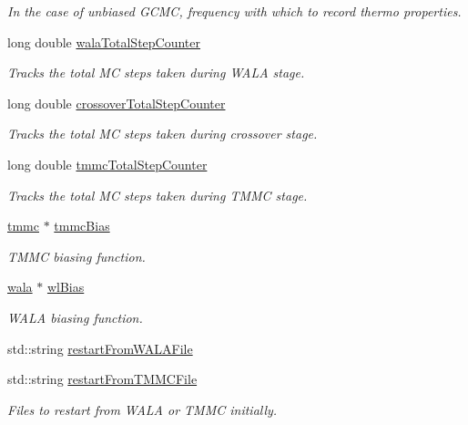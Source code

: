 \begin{DoxyCompactItemize}
\begin{DoxyCompactList}\small\item\em In the case of unbiased G\-C\-M\-C, frequency with which to record thermo properties. \end{DoxyCompactList}\item 
long double \hyperlink{classsim_system_a46f5d3a8843821b45fd3f4d9234a177f}{wala\-Total\-Step\-Counter}
\begin{DoxyCompactList}\small\item\em Tracks the total M\-C steps taken during W\-A\-L\-A stage. \end{DoxyCompactList}\item 
long double \hyperlink{classsim_system_a1d71d1df76bba70136853e30823d2db9}{crossover\-Total\-Step\-Counter}
\begin{DoxyCompactList}\small\item\em Tracks the total M\-C steps taken during crossover stage. \end{DoxyCompactList}\item 
long double \hyperlink{classsim_system_a3ca5ff86766ab388bfd7a48605b10e17}{tmmc\-Total\-Step\-Counter}
\begin{DoxyCompactList}\small\item\em Tracks the total M\-C steps taken during T\-M\-M\-C stage. \end{DoxyCompactList}\item 
\hyperlink{classtmmc}{tmmc} $\ast$ \hyperlink{classsim_system_a13173f45a1e40a5f5a3552b0ebe15b54}{tmmc\-Bias}
\begin{DoxyCompactList}\small\item\em T\-M\-M\-C biasing function. \end{DoxyCompactList}\item 
\hyperlink{classwala}{wala} $\ast$ \hyperlink{classsim_system_a6dc8d9f89dfcfa247a59bc50889c49e7}{wl\-Bias}
\begin{DoxyCompactList}\small\item\em W\-A\-L\-A biasing function. \end{DoxyCompactList}\item 
std\-::string \hyperlink{classsim_system_afbf0b172dc35572e71ec6d27a018e2fc}{restart\-From\-W\-A\-L\-A\-File}
\item 
std\-::string \hyperlink{classsim_system_a5ccdad82b3767ba21b1e4b1e36362082}{restart\-From\-T\-M\-M\-C\-File}
\begin{DoxyCompactList}\small\item\em Files to restart from W\-A\-L\-A or T\-M\-M\-C initially. \end{DoxyCompactList}\item 

\end{DoxyCompactItemize}
